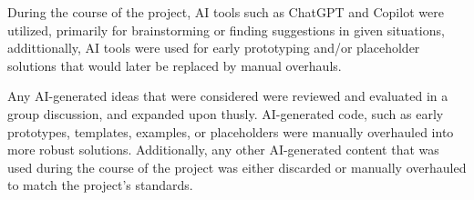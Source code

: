 



\noindent
During the course of the project, AI tools such as ChatGPT and Copilot were utilized,
primarily for brainstorming or finding suggestions in given situations, 
addittionally, AI tools were used for early prototyping and/or placeholder solutions that would later be replaced by manual overhauls.

Any AI-generated ideas that were considered were reviewed and evaluated in a group discussion, and expanded upon thusly.
AI-generated code, such as early prototypes, templates, examples, or placeholders were manually overhauled into more robust solutions.
Additionally, any other AI-generated content that was used during the course of the project was either discarded or manually overhauled to match the project's standards.